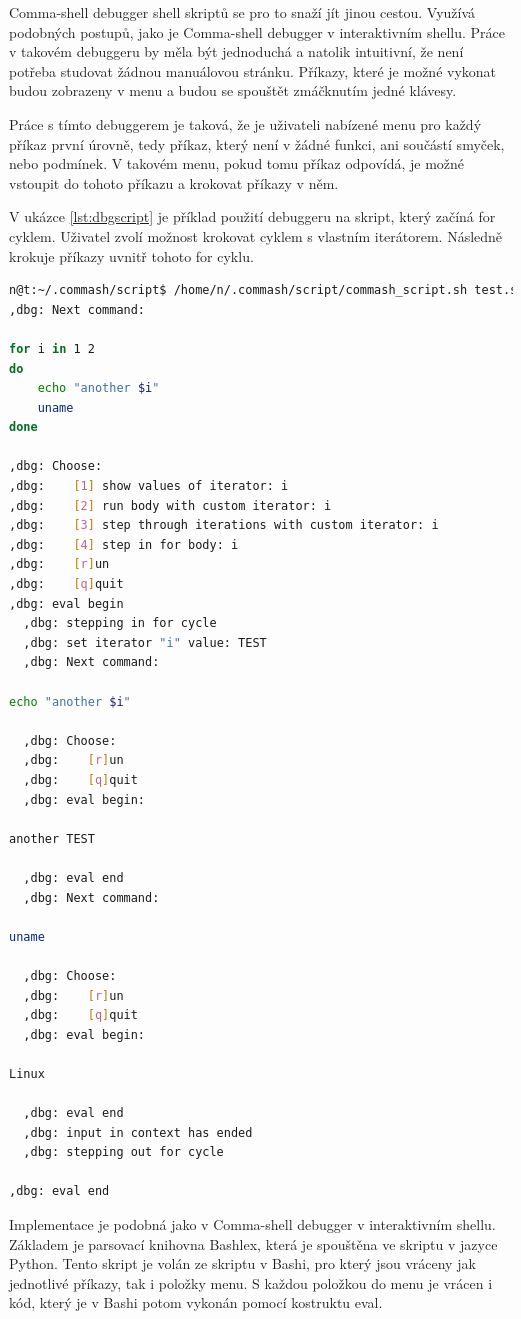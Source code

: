 \documentclass[thesis=M,czech]{FITthesis}[2012/06/26]
\begin{document}
Comma-shell debugger shell skriptů se pro to snaží jít jinou cestou. Využívá podobných postupů, jako je Comma-shell debugger v interaktivním shellu. Práce v takovém debuggeru by měla být jednoduchá a natolik intuitivní, že není potřeba studovat žádnou manuálovou stránku. Příkazy, které je možné vykonat budou zobrazeny v menu a budou se spouštět zmáčknutím jedné klávesy.

Práce s tímto debuggerem je taková, že je uživateli nabízené menu pro každý příkaz první úrovně, tedy příkaz, který není v žádné funkci, ani součástí smyček, nebo podmínek. V takovém menu, pokud tomu příkaz odpovídá, je možné vstoupit do tohoto příkazu a krokovat příkazy v něm.

V ukázce \ref{lst:dbgscript} je příklad použití debuggeru na skript, který začíná for cyklem. Uživatel zvolí možnost krokovat cyklem s vlastním iterátorem. Následně krokuje příkazy uvnitř tohoto for cyklu.

\begin{minipage}{\linewidth}
\begin{lstlisting}[language=bash, caption={Debugger shell skriptu}, label={lst:dbgscript}]
n@t:~/.commash/script$ /home/n/.commash/script/commash_script.sh test.sh
,dbg: Next command:

for i in 1 2
do
	echo "another $i"
	uname
done

,dbg: Choose:
,dbg:    [1] show values of iterator: i
,dbg:    [2] run body with custom iterator: i
,dbg:    [3] step through iterations with custom iterator: i
,dbg:    [4] step in for body: i
,dbg:    [r]un
,dbg:    [q]quit
,dbg: eval begin
  ,dbg: stepping in for cycle
  ,dbg: set iterator "i" value: TEST
  ,dbg: Next command:

echo "another $i"

  ,dbg: Choose:
  ,dbg:    [r]un
  ,dbg:    [q]quit
  ,dbg: eval begin:

another TEST

  ,dbg: eval end
  ,dbg: Next command:

uname

  ,dbg: Choose:
  ,dbg:    [r]un
  ,dbg:    [q]quit
  ,dbg: eval begin:

Linux

  ,dbg: eval end
  ,dbg: input in context has ended
  ,dbg: stepping out for cycle

,dbg: eval end
\end{lstlisting}
\end{minipage}


Implementace je podobná jako v Comma-shell debugger v interaktivním shellu. Základem je parsovací knihovna Bashlex, která je spouštěna ve skriptu v jazyce Python. Tento skript je volán ze skriptu v Bashi, pro který jsou vráceny jak jednotlivé příkazy, tak i položky menu. S každou položkou do menu je vrácen i kód, který je v Bashi potom vykonán pomocí kostruktu eval.
\end{document}
